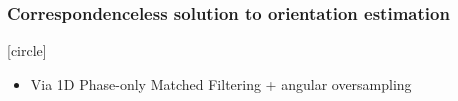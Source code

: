 \begin{frame}[noframenumbering]

  \frametitle{Correspondenceless solution to orientation estimation}


  \vspace{0.1cm}
  [circle]
  \begin{itemize}
    \item Via 1D Phase-only Matched Filtering + angular oversampling
  \end{itemize}
  \vspace{-0.25cm}

  \begin{center}
  \end{center}

\end{frame}
